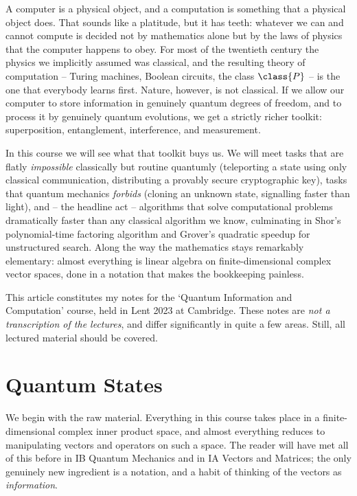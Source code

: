 



A computer is a physical object, and a computation is something that a physical object does. That sounds like a platitude, but it has teeth: whatever we can and cannot compute is decided not by mathematics alone but by the laws of physics that the computer happens to obey. For most of the twentieth century the physics we implicitly assumed was classical, and the resulting theory of computation -- Turing machines, Boolean circuits, the class $\class{P}$ -- is the one that everybody learns first. Nature, however, is not classical. If we allow our computer to store information in genuinely quantum degrees of freedom, and to process it by genuinely quantum evolutions, we get a strictly richer toolkit: superposition, entanglement, interference, and measurement.

In this course we will see what that toolkit buys us. We will meet tasks that are flatly \emph{impossible} classically but routine quantumly (teleporting a state using only classical communication, distributing a provably secure cryptographic key), tasks that quantum mechanics \emph{forbids} (cloning an unknown state, signalling faster than light), and -- the headline act -- algorithms that solve computational problems dramatically faster than any classical algorithm we know, culminating in Shor's polynomial-time factoring algorithm and Grover's quadratic speedup for unstructured search. Along the way the mathematics stays remarkably elementary: almost everything is linear algebra on finite-dimensional complex vector spaces, done in a notation that makes the bookkeeping painless.

This article constitutes my notes for the `Quantum Information and Computation' course, held in Lent 2023 at Cambridge. These notes are \emph{not a transcription of the lectures}, and differ significantly in quite a few areas. Still, all lectured material should be covered.



\section{Quantum States}

We begin with the raw material. Everything in this course takes place in a finite-dimensional complex inner product space, and almost everything reduces to manipulating vectors and operators on such a space. The reader will have met all of this before in IB Quantum Mechanics and in IA Vectors and Matrices; the only genuinely new ingredient is a notation, and a habit of thinking of the vectors as \emph{information}.

